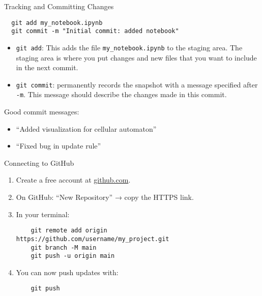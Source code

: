 \documentclass[aspectratio=169,13pt]{beamer}
\begin{document}
\begin{frame}[fragile]{Tracking and Committing Changes}
    \begin{verbatim}
  git add my_notebook.ipynb
  git commit -m "Initial commit: added notebook"
  \end{verbatim}

    \begin{itemize}
        \item \texttt{git add}: This adds the file \texttt{my\_notebook.ipynb} to the staging area. The staging area is where you put changes and new files that you want to include in the next commit.
        \item \texttt{git commit}: permanently records the snapshot with a message specified after \texttt{-m}. This message should describe the changes made in this commit.
    \end{itemize}

    \vspace{0.5em}
    Good commit messages:
    \begin{itemize}
        \item “Added visualization for cellular automaton”
        \item “Fixed bug in update rule”
    \end{itemize}
\end{frame}

\begin{frame}[fragile]{Connecting to GitHub}
    \begin{enumerate}
        \item Create a free account at \href{https://github.com}{github.com}.
        \item On GitHub: “New Repository” → copy the HTTPS link.
        \item In your terminal:
              \begin{verbatim}
    git remote add origin https://github.com/username/my_project.git
    git branch -M main
    git push -u origin main
    \end{verbatim}
        \item You can now push updates with:
              \begin{verbatim}
    git push
    \end{verbatim}
    \end{enumerate}
\end{frame}
\end{document}

